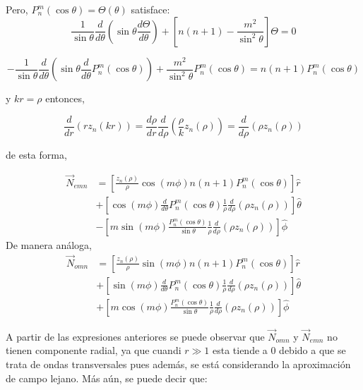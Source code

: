 Pero, $P_n^m(\cos\theta)=\Theta(\theta)$ satisface:
\begin{equation*}
    \frac{1}{\sin\theta}\frac{d}{d\theta}\left(\sin\theta\frac{d\Theta}{d\theta}\right)+\left[n(n+1)-\frac{m^2}{\sin^2\theta}\right]\Theta=0
\end{equation*}


$$-\frac{1}{\sin\theta}\frac{d}{d\theta} \left(\sin\theta \frac{d}{d\theta}P_n^m(\cos\theta)\right)+\frac{m^2}{\sin^2\theta}P_n^m(\cos\theta)=n(n+1)P_n^m(\cos\theta)$$

y $kr=\rho$ entonces, 

$$\frac{d}{d r}(rz_n(kr))=\frac{d\rho}{d r}\frac{d}{d\rho}\left(\frac{\rho}{k}z_n(\rho)\right)=\frac{d}{d\rho}(\rho z_n(\rho))$$

de esta forma, 

\begin{align*}
     \Vec{N}_{emn}&=\left[\frac{z_n(\rho)}{\rho}\cos(m\phi)n(n+1)P_n^m(\cos\theta)\right]\hat{r}\\
     &+\left[\cos(m\phi)\frac{d}{d\theta}P_n^m(\cos\theta)\frac{1}{\rho}\frac{d}{d\rho}(\rho z_n(\rho))\right]\hat{\theta}\\&-\left[m\sin(m\phi)\frac{P_n^m(\cos\theta)}{\sin\theta}\frac{1}{\rho}\frac{d}{d\rho}(\rho z_n(\rho))\right]\hat{\phi}
\end{align*}
De manera análoga,
\begin{align*}
     \Vec{N}_{omn}&=\left[\frac{z_n(\rho)}{\rho}\sin(m\phi)n(n+1)P_n^m(\cos\theta)\right]\hat{r}\\
     &+\left[\sin(m\phi)\frac{d}{d\theta}P_n^m(\cos\theta)\frac{1}{\rho}\frac{d}{d\rho}(\rho z_n(\rho))\right]\hat{\theta}\\&+\left[m\cos(m\phi)\frac{P_n^m(\cos\theta)}{\sin\theta}\frac{1}{\rho}\frac{d}{d\rho}(\rho z_n(\rho))\right]\hat{\phi}
\end{align*}

A partir de las expresiones anteriores se puede observar que $\Vec{N}_{omn}$ y $\Vec{N}_{emn}$ no tienen componente radial, ya que cuandi $r\gg 1$ esta tiende a 0 debido a que se trata de ondas transversales pues además, se está considerando la aproximación de campo lejano. Más aún, se puede decir que:
 
\begin{center}
\end{center}

